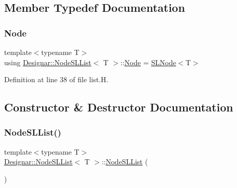 \subsection{Member Typedef Documentation}
\mbox{\label{class_designar_1_1_node_s_l_list_a41963019ada1025099e3259207a3de96}} 
\subsubsection{\texorpdfstring{Node}{Node}}
{\footnotesize\ttfamily template$<$typename T$>$ \\
using \hyperlink{class_designar_1_1_node_s_l_list}{Designar\+::\+Node\+S\+L\+List}$<$ T $>$\+::\hyperlink{class_designar_1_1_node_s_l_list_a41963019ada1025099e3259207a3de96}{Node} =  \hyperlink{class_designar_1_1_s_l_node}{S\+L\+Node}$<$T$>$}



Definition at line 38 of file list.\+H.



\subsection{Constructor \& Destructor Documentation}
\mbox{\label{class_designar_1_1_node_s_l_list_a110541373e8c54e124136d6c82861e6b}} 
\subsubsection{\texorpdfstring{Node\+S\+L\+List()}{NodeSLList()}\hspace{0.1cm}{\footnotesize\ttfamily [1/3]}}
{\footnotesize\ttfamily template$<$typename T$>$ \\
\hyperlink{class_designar_1_1_node_s_l_list}{Designar\+::\+Node\+S\+L\+List}$<$ T $>$\+::\hyperlink{class_designar_1_1_node_s_l_list}{Node\+S\+L\+List} (\begin{DoxyParamCaption}{ }\end{DoxyParamCaption})\hspace{0.3cm}{\ttfamily [inline]}}




